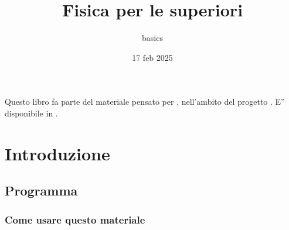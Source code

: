 \documentclass[letterpaper,10pt,italian]{jupyterBook}
\title{Fisica per le superiori}
\date{17 feb 2025}
\author{basics}
\begin{document}
\pagestyle{empty}
\sphinxmaketitle
\pagestyle{plain}
\sphinxtableofcontents
\pagestyle{normal}
\label{\detokenize{intro::doc}}


\sphinxAtStartPar
Questo libro fa parte del materiale pensato per , nell’ambito del progetto . E” disponibile in .





\sphinxstepscope


\part{Introduzione}

\sphinxstepscope


\chapter{Programma}
\label{\detokenize{ch/program:programma}}\label{\detokenize{ch/program:physics-hs-program}}\label{\detokenize{ch/program::doc}}

\section{Come usare questo materiale}
\label{\detokenize{ch/program:come-usare-questo-materiale}}
\end{document}
